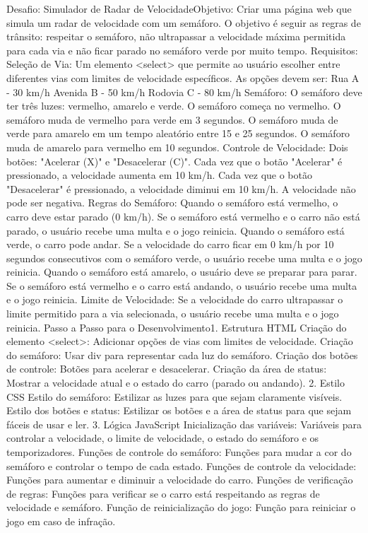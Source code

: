 Desafio: Simulador de Radar de VelocidadeObjetivo:
Criar uma página web que simula um radar de velocidade com um semáforo. O objetivo é seguir as regras de trânsito: respeitar o semáforo, não ultrapassar a velocidade máxima permitida para cada via e não ficar parado no semáforo verde por muito tempo.
Requisitos:
Seleção de Via:
Um elemento <select> que permite ao usuário escolher entre diferentes vias com limites de velocidade específicos.
As opções devem ser:
Rua A - 30 km/h
Avenida B - 50 km/h
Rodovia C - 80 km/h
Semáforo:
O semáforo deve ter três luzes: vermelho, amarelo e verde.
O semáforo começa no vermelho.
O semáforo muda de vermelho para verde em 3 segundos.
O semáforo muda de verde para amarelo em um tempo aleatório entre 15 e 25 segundos.
O semáforo muda de amarelo para vermelho em 10 segundos.
Controle de Velocidade:
Dois botões: "Acelerar (X)" e "Desacelerar (C)".
Cada vez que o botão "Acelerar" é pressionado, a velocidade aumenta em 10 km/h.
Cada vez que o botão "Desacelerar" é pressionado, a velocidade diminui em 10 km/h.
A velocidade não pode ser negativa.
Regras do Semáforo:
Quando o semáforo está vermelho, o carro deve estar parado (0 km/h).
Se o semáforo está vermelho e o carro não está parado, o usuário recebe uma multa e o jogo reinicia.
Quando o semáforo está verde, o carro pode andar. Se a velocidade do carro ficar em 0 km/h por 10 segundos consecutivos com o semáforo verde, o usuário recebe uma multa e o jogo reinicia.
Quando o semáforo está amarelo, o usuário deve se preparar para parar.
Se o semáforo está vermelho e o carro está andando, o usuário recebe uma multa e o jogo reinicia.
Limite de Velocidade:
Se a velocidade do carro ultrapassar o limite permitido para a via selecionada, o usuário recebe uma multa e o jogo reinicia.
Passo a Passo para o Desenvolvimento1. Estrutura HTML
Criação do elemento <select>:
Adicionar opções de vias com limites de velocidade.
Criação do semáforo:
Usar div para representar cada luz do semáforo.
Criação dos botões de controle:
Botões para acelerar e desacelerar.
Criação da área de status:
Mostrar a velocidade atual e o estado do carro (parado ou andando).
2. Estilo CSS
Estilo do semáforo:
Estilizar as luzes para que sejam claramente visíveis.
Estilo dos botões e status:
Estilizar os botões e a área de status para que sejam fáceis de usar e ler.
3. Lógica JavaScript
Inicialização das variáveis:
Variáveis para controlar a velocidade, o limite de velocidade, o estado do semáforo e os temporizadores.
Funções de controle do semáforo:
Funções para mudar a cor do semáforo e controlar o tempo de cada estado.
Funções de controle da velocidade:
Funções para aumentar e diminuir a velocidade do carro.
Funções de verificação de regras:
Funções para verificar se o carro está respeitando as regras de velocidade e semáforo.
Função de reinicialização do jogo:
Função para reiniciar o jogo em caso de infração.